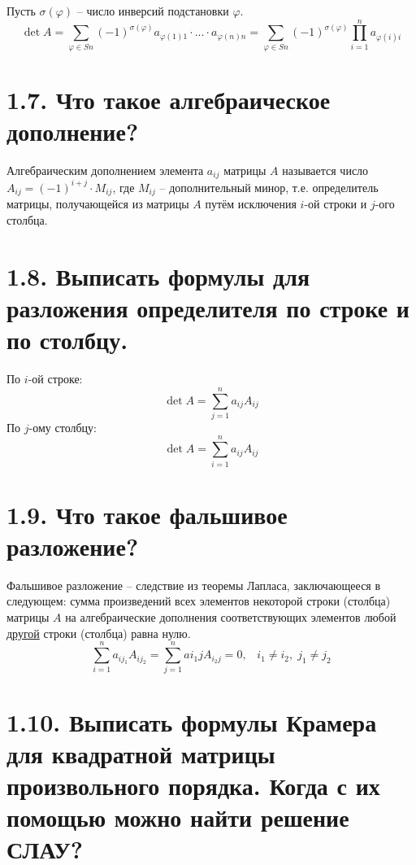 \documentclass{article}
\begin{document}
Пусть $\sigma(\varphi)$ -- число инверсий подстановки $\varphi$.
$$
\det{A} = \sum_{\varphi \in Sn}(-1)^{\sigma(\varphi)}a_{\varphi(1)1}\cdot...\cdot a_{\varphi(n)n} = \sum_{\varphi \in Sn}(-1)^{\sigma(\varphi)} \prod_{i = 1}^n a_{\varphi(i)i}
$$

\section*{\LARGE 1.7. Что такое алгебраическое дополнение?  }

Алгебраическим дополнением элемента $a_{ij}$ матрицы $A$ называется число 
\newline $A_{ij} = (-1)^{i + j}\cdot M_{ij}$, где $M_{ij}$ -- дополнительный минор, т.е. определитель матрицы, получающейся из матрицы $A$ путём исключения $i$-ой строки и $j$-ого столбца.

\section*{\LARGE 1.8. Выписать формулы для разложения определителя по строке и по столбцу. }

По $i$-ой строке:
$$
\det{A} = \sum_{j = 1}^n a_{ij}A_{ij}
$$
По $j$-ому столбцу:
$$
\det{A} = \sum_{i = 1}^n a_{ij}A_{ij}
$$

\section*{\LARGE 1.9. Что такое фальшивое разложение?  }

Фальшивое разложение -- следствие из теоремы Лапласа, заключающееся в следующем: сумма произведений всех элементов некоторой строки (столбца) матрицы $A$ на алгебраические дополнения соответствующих элементов любой \underline{другой} строки (столбца) равна нулю.
$$
\sum_{i = 1}^n a_{ij_1}A_{ij_2} = \sum_{j = 1}^n a{i_1j}A_{i_2j} = 0, \;\;\;i_1 \ne i_2, \; j_1 \ne j_2
$$

\section*{\LARGE 1.10. Выписать формулы Крамера для квадратной матрицы произвольного порядка. Когда с их помощью можно найти решение СЛАУ?  }
\end{document}
